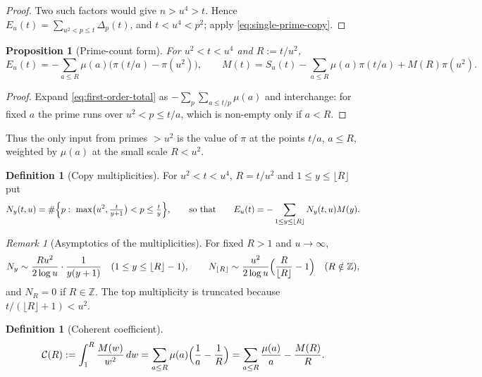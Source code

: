 \documentclass[11pt]{amsart}
\numberwithin{equation}{section}
\theoremstyle{plain}
\newtheorem{proposition}[theorem]{Proposition}
\theoremstyle{definition}
\newtheorem{definition}[theorem]{Definition}
\theoremstyle{remark}
\newtheorem{remark}[theorem]{Remark}
\newcommand{\Cc}{\mathcal{C}}
\begin{document}
\begin{proof}
Two such factors would give $n>u^4>t$. Hence $E_u(t)=\sum_{u^2<p\le t}
\Delta_p(t)$, and $t<u^4<p^2$; apply \eqref{eq:single-prime-copy}.
\end{proof}

\begin{proposition}[Prime-count form]
\label{prop:prime_count_form}
For $u^2<t<u^4$ and $R:=t/u^2$,
\begin{equation}
\label{eq:prime_count_form}
  E_u(t)=-\sum_{a\le R}\mu(a)\bigl(\pi(t/a)-\pi(u^2)\bigr),
  \qquad
  M(t)=S_u(t)-\sum_{a\le R}\mu(a)\pi(t/a)+M(R)\pi(u^2).
\end{equation}
\end{proposition}

\begin{proof}
Expand \eqref{eq:first-order-total} as $-\sum_{p}\sum_{a\le t/p}\mu(a)$ and
interchange: for fixed $a$ the prime runs over $u^2<p\le t/a$, which is
non-empty only if $a<R$.
\end{proof}

Thus the only input from primes $>u^2$ is the value of $\pi$ at the points
$t/a$, $a\le R$, weighted by $\mu(a)$ at the small scale $R<u^2$.

\begin{definition}[Copy multiplicities]
\label{def:copy-multiplicity}
For $u^2<t<u^4$, $R=t/u^2$ and $1\le y\le\lfloor R\rfloor$ put
\begin{equation}
\label{eq:Ny-exact}
  N_y(t,u)=\#\Bigl\{p:\ \max\bigl(u^2,\tfrac{t}{y+1}\bigr)<p\le\tfrac ty\Bigr\},
  \qquad\text{so that}\qquad
  E_u(t)=-\sum_{1\le y\le\lfloor R\rfloor}N_y(t,u)M(y).
\end{equation}
\end{definition}

\begin{remark}[Asymptotics of the multiplicities]
\label{rem:copy-count-asymptotic}
For fixed $R>1$ and $u\to\infty$,
\begin{equation}
\label{eq:Ny-fixed-R}
  N_y\sim\frac{Ru^2}{2\log u}\cdot\frac1{y(y+1)}\quad(1\le y\le\lfloor R\rfloor-1),
  \qquad
  N_{\lfloor R\rfloor}\sim\frac{u^2}{2\log u}\Bigl(\frac R{\lfloor R\rfloor}-1\Bigr)
  \quad(R\notin\mathbb{Z}),
\end{equation}
and $N_R=0$ if $R\in\mathbb{Z}$. The top multiplicity is truncated because
$t/(\lfloor R\rfloor+1)<u^2$.
\end{remark}

\begin{definition}[Coherent coefficient]
\label{def:coherent_coefficient}
\begin{equation}
\label{eq:C_def}
  \Cc(R):=\int_1^R\frac{M(w)}{w^2}\,dw
  =\sum_{a\le R}\mu(a)\Bigl(\frac1a-\frac1R\Bigr)
  =\sum_{a\le R}\frac{\mu(a)}a-\frac{M(R)}R .
\end{equation}
\end{definition}
\end{document}
